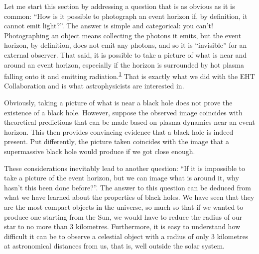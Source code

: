 Let me start this section by addressing a question that is as obvious as it is common:
``How is it possible to photograph an event horizon if, by definition, it cannot emit
light?''. The answer is simple and categorical: you can't! Photographing an object means
collecting the photons it emits, but the event horizon, by
definition, does not emit any photons, and so it is ``invisible'' for an external
observer. That said, it is possible to take a picture of what is near and around an
event horizon, especially if the horizon is surrounded by hot plasma
falling onto it and emitting radiation.\textsuperscript{\hyperlink{note:07-01}{1}} That is exactly what we did
with the EHT Collaboration and is what astrophysicists are interested in.

Obviously, taking a picture of what is near a black hole does not prove the existence of
a black hole. However, suppose the observed image coincides with theoretical predictions
that can be made based on plasma dynamics near an event horizon. This
then provides convincing evidence that a black hole is indeed present. Put differently,
the picture taken coincides with the image that a supermassive black hole would produce
if we got close enough.

These considerations inevitably lead to another question: ``If it is impossible to take
a picture of the event horizon, but we can image what is around it, why hasn't this been
done before?''. The answer to this question can be deduced from what we have learned
about the properties of black holes. We have seen that they are the most compact objects
in the universe, so much so that if we wanted to produce one starting from the Sun, we
would have to reduce the radius of our star to no more than 3 kilometres. Furthermore,
it is easy to understand how difficult it can be to observe a celestial object with a
radius of only 3 kilometres at astronomical distances from us, that is, well outside the
solar system.

